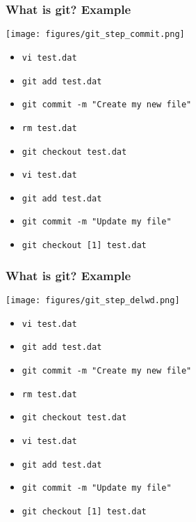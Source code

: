 \documentclass[xcolor=dvipsnames,10pt]{beamer}
\begin{document}
\addtocounter{framenumber}{-1}
\begin{frame}
 \frametitle{What is git? Example}
 
 \begin{center}
  \texttt{[image: figures/git\_step\_commit.png]}
 \end{center}
 \vspace*{-0.5cm}
 
 \begin{itemize}
  \color{gray}
  \item[] \texttt{vi test.dat}
  \item[] \texttt{git add test.dat}
  \color{black}
  \item   \texttt{git commit -m "Create my new file"}
  \color{white}
  \item[] \texttt{rm test.dat}
  \item[] \texttt{git checkout test.dat}
  \item[] \texttt{vi test.dat}
  \item[] \texttt{git add test.dat}
  \item[] \texttt{git commit -m "Update my file"}
  \item[] \texttt{git checkout [1] test.dat}
 \end{itemize}


\end{frame}
\addtocounter{framenumber}{-1}
\begin{frame}
 \frametitle{What is git? Example}
 
 \begin{center}
  \texttt{[image: figures/git\_step\_delwd.png]}
 \end{center}
 \vspace*{-0.5cm}
 
 \begin{itemize}
  \color{gray}
  \item[] \texttt{vi test.dat}
  \item[] \texttt{git add test.dat}
  \item[] \texttt{git commit -m "Create my new file"}
  \color{black}
  \item   \texttt{rm test.dat}
  \color{white}
  \item[] \texttt{git checkout test.dat}
  \item[] \texttt{vi test.dat}
  \item[] \texttt{git add test.dat}
  \item[] \texttt{git commit -m "Update my file"}
  \item[] \texttt{git checkout [1] test.dat}
 \end{itemize}

\end{frame}
\end{document}
